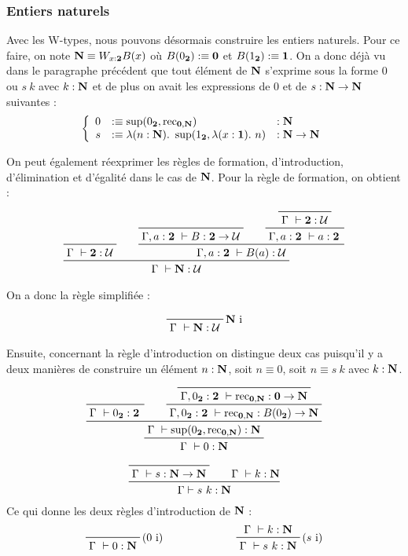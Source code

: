 \documentclass[../../rapport.tex]{subfiles}
\begin{document}
  \subsubsection{Entiers naturels}

  Avec les W-types, nous pouvons désormais construire les entiers naturels.
  Pour ce faire, on note $\mathbf N \equiv W_{x : \operatorname{\textbf{2}}}B(x)$ où $B(0_{\operatorname{\textbf{2}}}) :\equiv \operatorname{\textbf{0}}$ et $B(1_{\operatorname{\textbf{2}}}) :\equiv \operatorname{\textbf{1}}$.
  On a donc déjà vu dans le paragraphe précédent que tout élément de $\mathbf N$ s'exprime sous la forme $0$ ou $s\ k$
  avec $k : \mathbf N$ et de plus on avait les expressions de $0$ et de $s : \mathbf N \rightarrow \mathbf N$ suivantes :
  $$\left\{ \begin{array}{rll}
      0 &:\equiv \sup(0_{\2}, \rec_{\0, \N}) 				&: \N \\
      s &:\equiv \lambda(n : \N).\ \sup(1_{\2}, \lambda(x : \1).\ n)	&: \N \fun \N
  \end{array}\right.$$

  On peut également réexprimer les règles de formation, d'introduction, d'élimination et d'égalité dans le cas de $\mathbf N$.
  Pour la règle de formation, on obtient :

  $$
  \prfinterspace=2em
  \prftree
    {\prfaxiom{\Gamma\ \vdash \2 : \U}}
    {\prftree
      {\prfaxiom{\Gamma, a : \2\ \vdash B : \2 \fun \U}}
      {\prftree
	{\prfaxiom{\Gamma\ \vdash \2 : \U}}
      {\Gamma, a : \2\ \vdash a : \2}}
    {\Gamma, a : \2\ \vdash B(a) : \U}}
  {\Gamma\ \vdash \N : \U}
  $$

  On a donc la règle simplifiée :

  $$
  \prfbyaxiom{$\N$ i}
    {\Gamma\ \vdash \N : \U}
  $$

  Ensuite, concernant la règle d'introduction on distingue deux cas puisqu'il y a deux manières de construire
  un élément $n : \mathbf N$, soit $n \equiv 0$, soit $n \equiv s\ k$ avec $k : \mathbf N$.

  $$
  \prfinterspace=2em
  \prftree
    {\prftree
      {\prfaxiom{\Gamma\ \vdash 0_{\2} : \2}}
      {\prftree
	{\prfaxiom{\Gamma, 0_{\2} : \2\ \vdash \rec_{\0, \N} : \0 \fun \N}}
      {\Gamma, 0_{\2} : \2\ \vdash \rec_{\0, \N} : B(0_{\2}) \fun \N}}
    {\Gamma\ \vdash \sup(0_{\2}, \rec_{\0, \N}) : \N}}
  {\Gamma\ \vdash 0 : \N}
  $$

  $$
  \prfinterspace=2em
  \prftree
    {\prfaxiom{\Gamma\ \vdash s : \N \fun \N}}
    {\Gamma\ \vdash k : \N}
  {\Gamma \vdash s\ k : \N}
  $$
  Ce qui donne les deux règles d'introduction de $\mathbf N$ :
  $$\begin{array}{cc}
    \prfbyaxiom{($0$ i)}{\Gamma\ \vdash 0 : \N}\hspace{2cm} & \prftree[r]{($s$ i)}{\Gamma\ \vdash k : \N}{\Gamma\ \vdash s\ k : \N}
  \end{array}$$
\end{document}
